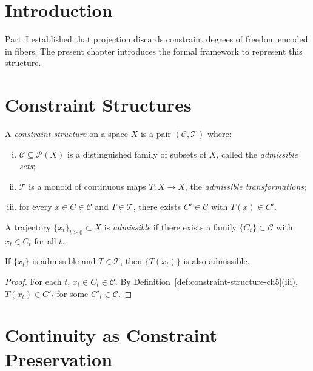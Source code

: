 \documentclass[11pt,openany]{book}
\begin{document}
\section{Introduction}
\label{sec:introduction-constraints}

Part~I established that projection discards constraint
degrees of freedom encoded in fibers. The present chapter
introduces the formal framework to represent this structure.

\section{Constraint Structures}
\label{sec:constraint-structures}

\begin{definition}
\label{def:constraint-structure-ch5}
A \emph{constraint structure} on a space $X$ is a pair
$(\mathcal{C}, \mathcal{T})$ where:
\begin{enumerate}[(i)]
  \item $\mathcal{C} \subseteq \mathcal{P}(X)$ is a
    distinguished family of subsets of $X$, called the
    \emph{admissible sets};
  \item $\mathcal{T}$ is a monoid of continuous maps
    $T : X \to X$, the \emph{admissible transformations};
  \item for every $x \in C \in \mathcal{C}$ and $T \in
    \mathcal{T}$, there exists $C' \in \mathcal{C}$ with
    $T(x) \in C'$.
\end{enumerate}
\end{definition}

\begin{definition}
A trajectory $\{x_t\}_{t \ge 0} \subset X$ is
\emph{admissible} if there exists a family $\{C_t\} \subset
\mathcal{C}$ with $x_t \in C_t$ for all $t$.
\end{definition}

\begin{proposition}
If $\{x_t\}$ is admissible and $T \in \mathcal{T}$, then
$\{T(x_t)\}$ is also admissible.
\end{proposition}

\begin{proof}
For each $t$, $x_t \in C_t \in \mathcal{C}$. By
Definition~\ref{def:constraint-structure-ch5}(iii),
$T(x_t) \in C'_t$ for some $C'_t \in \mathcal{C}$.
\end{proof}

\section{Continuity as Constraint Preservation}
\label{sec:continuity-constraint}
\end{document}
